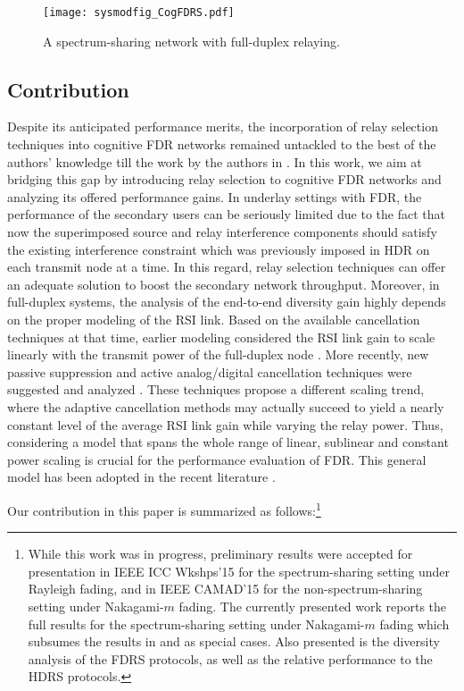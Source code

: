 \documentclass[10pt,journal]{IEEEtran}
\newcommand{\figscal}{0.8}
\begin{document}
\begin{figure}[!t]
\centering
\texttt{[image: sysmodfig\_CogFDRS.pdf]}
\caption{A spectrum-sharing network with full-duplex relaying.}
\label{sysmodfig_CogFDRS}
\vspace{-3mm}
\end{figure}

\subsection{Contribution}
Despite its anticipated performance merits, the incorporation of relay selection techniques into cognitive \ac{FDR} networks remained untackled to the best of the authors' knowledge till the work by the authors in \cite{Khafagy_CogFDRS_ICCW15}. In this work, we aim at bridging this gap by introducing relay selection to cognitive \ac{FDR} networks and analyzing its offered performance gains. In underlay settings with \ac{FDR}, the performance of the secondary users can be seriously limited due to the fact that now the superimposed source and relay interference components should satisfy the existing interference constraint which was previously imposed in \ac{HDR} on each transmit node at a time. In this regard, relay selection techniques can offer an adequate solution to boost the secondary network throughput. Moreover, in full-duplex systems, the analysis of the end-to-end diversity gain highly depends on the proper modeling of the \ac{RSI} link. Based on the available cancellation techniques at that time, earlier modeling considered the RSI link gain to scale linearly with the transmit power of the full-duplex node \cite{201307_TWC_Elsayed_FD}. More recently, new passive suppression and active analog/digital cancellation techniques were suggested and analyzed \cite{201308_SIGCOMM_FD_Radios,2015XX_TWC_Elsayed_FD1,2015XX_TWC_Elsayed_FD2}. These techniques propose a different scaling trend, where the adaptive cancellation methods may actually succeed to yield a nearly constant level of the average RSI link gain while varying the relay power. Thus, considering a model that spans the whole range of linear, sublinear and constant power scaling is crucial for the performance evaluation of \ac{FDR}. This general model has been adopted in the recent literature \cite{6832455,2015XX_TWC_Khafagy_FDR}. 

Our contribution in this paper is summarized as follows:\footnote{While this work was in progress, preliminary results were accepted for presentation in IEEE ICC Wkshps'15 \cite{Khafagy_CogFDRS_ICCW15} for the spectrum-sharing setting under Rayleigh fading, and in IEEE CAMAD'15 \cite{Khafagy_FDRS_CAMAD15} for the non-spectrum-sharing setting under Nakagami-$m$ fading. The currently presented work reports the full results for the spectrum-sharing setting under Nakagami-$m$ fading which subsumes the results in \cite{Khafagy_CogFDRS_ICCW15} and \cite{Khafagy_FDRS_CAMAD15} as special cases. Also presented is the diversity analysis of the \ac{FDRS} protocols, as well as the relative performance to the \ac{HDRS} protocols. }
\end{document}
